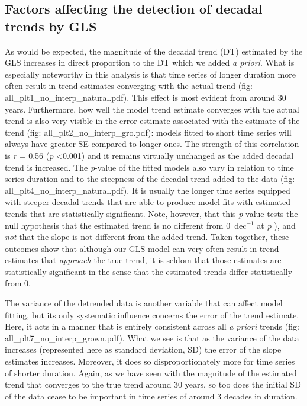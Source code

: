 \subsection{Factors affecting the detection of decadal trends by GLS}
As would be expected, the magnitude of the decadal trend (DT) estimated by the GLS increases in direct proportion to the DT which we added \emph{a priori}. What is especially noteworthy in this analysis is that time series of longer duration more often result in trend estimates converging with the actual trend (fig: all_plt1_no_interp_natural.pdf). This effect is most evident from around 30 years. Furthermore, how well the model trend estimate converges with the actual trend is also very visible in the error estimate associated with the estimate of the trend (fig: all_plt2_no_interp_gro.pdf): models fitted to short time series will always have greater SE compared to longer ones. The strength of this correlation  is \emph{r} = 0.56 (\emph{p} <0.001) and it remains virtually unchanged as the added decadal trend is increased. The \emph{p}-value of the fitted models also vary in relation to time series duration and to the steepness of the decadal trend added to the data (fig: all_plt4_no_interp_natural.pdf). It is usually the longer time series equipped with steeper decadal trends that are able to produce model fits with estimated trends that are statistically significant. Note, however, that this \emph{p}-value tests the null hypothesis that the estimated trend is no different from \si{0}{\degreeCelsius}~dec$^{-1}$ at \emph{p} ), and \emph{not} that the slope is not different from the added trend. Taken together, these outcomes show that although our GLS model can very often result in trend estimates that \emph{approach} the true trend, it is seldom that those estimates are statistically significant in the sense that the estimated trends differ statistically from 0.

The variance of the detrended data is another variable that can affect model fitting, but its only systematic influence concerns the error of the trend estimate. Here, it acts in a manner that is entirely consistent across all \emph{a priori} trends (fig: all_plt7_no_interp_grown.pdf). What we see is that as the variance of the data increases (represented here as standard deviation, SD) the error of the slope estimates increases. Moreover, it does so disproportionately more for time series of shorter duration. Again, as we have seen with the magnitude of the estimated trend that converges to the true trend around 30 years, so too does the initial SD of the data cease to be important in time series of around 3 decades in duration.

